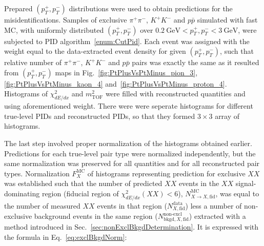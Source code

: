 Prepared $(p_{T}^{+}, p_{T}^{-})$ distributions were used to obtain predictions for the misidentifications. Samples of exclusive $\pi^{+}\pi^{-}$, $K^{+}K^{-}$ and $p\bar{p}$ simulated with fast MC, with uniformly distributed $(p_{T}^{+}, p_{T}^{-})$ over $0.2~\text{GeV}<p_{T}^{+}, p_{T}^{-}<3~\text{GeV}$, were subjected to PID algorithm~\ref{enum:CutPid}. Each event was assigned with the weight equal to the data-extracted event density for given $(p_{T}^{+}, p_{T}^{-})$, such that relative number of $\pi^{+}\pi^{-}$, $K^{+}K^{-}$ and $p\bar{p}$ pairs was exactly the same as it resulted from $(p_{T}^{+}, p_{T}^{-})$ maps in Fig.~\ref{fig:PtPlusVsPtMinus_pion_3}, \ref{fig:PtPlusVsPtMinus_kaon_4} and~\ref{fig:PtPlusVsPtMinus_proton_4}. Histograms of $\chi^{2}_{dE/dx}$ and $m^{2}_{\text{TOF}}$ were filled with reconstructed quantities and using aforementioned weight. There were were seperate histograms for different true-level PIDs and reconstructed PIDs, so that they formed $3\times3$ array of histograms.

The last step involved proper normalization of the histograms obtained earlier. Predictions for each true-level pair type were normalized independently, but the same normalization was preserved for all quantities and for all reconstructed pair types. Normalization $F^{\text{MC}}_{X}$ of histograms representing prediction for exclusive $XX$ was established such that the number of predicted $XX$ events in the $XX$ signal-dominating region (fiducial region of $\chi^{2}_{dE/dx}(XX)<6$), $N_{X\rightarrow X, \text{fid}}^{\text{MC}}$, was equal to the number of measured $XX$ events in that region ($N_{X,\text{fid}}^{\text{data}}$) less a number of non-exclusive background events in the same region ($N_{\text{bkgd},X,\text{fid}}^{\text{non-excl}}$) extracted with a method introduced in Sec.~\ref{sec:nonExclBkgdDetermination}. It is expressed with the formula in Eq.~\eqref{eq:exclBkgdNorm}:

